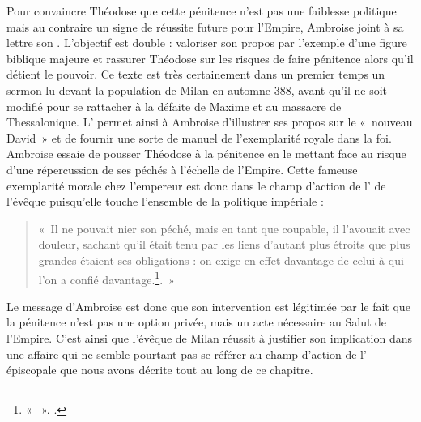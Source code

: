 \bigskip

Pour convaincre Théodose que cette pénitence n'est pas une faiblesse politique mais au contraire un signe de réussite future pour l'Empire, Ambroise joint à sa lettre son . L'objectif est double : valoriser son propos par l'exemple d'une figure biblique majeure et rassurer Théodose sur les risques de faire pénitence alors qu'il détient le pouvoir. Ce texte est très certainement dans un premier temps un sermon lu devant la population de Milan en automne 388, avant qu'il ne soit modifié pour se rattacher à la défaite de Maxime et au massacre de Thessalonique. L' permet ainsi à Ambroise d'illustrer ses propos sur le «~nouveau David~» et de fournir une sorte de manuel de l'exemplarité royale dans la foi. Ambroise essaie de pousser Théodose à la pénitence en le mettant face au risque d'une répercussion de ses péchés à l'échelle de l'Empire. Cette fameuse exemplarité morale chez l'empereur est donc dans le champ d'action de l' de l'évêque puisqu'elle touche l'ensemble de la politique impériale :

\bigskip

\begin{quote}
    «~Il ne pouvait nier son péché, mais en tant que coupable, il l’avouait avec douleur, sachant qu’il était tenu par les liens d'autant plus étroits que plus grandes étaient ses obligations : on exige en effet davantage de celui à qui l’on a confié davantage.\footnote{« ~». \cite[\nopp X, 51]{ambroise_apologie_david}.}.~»
\end{quote}

\bigskip

Le message d'Ambroise est donc que son intervention est légitimée par le fait que la pénitence n'est pas une option privée, mais un acte nécessaire au Salut de l'Empire. C'est ainsi que l'évêque de Milan réussit à justifier son implication dans une affaire qui ne semble pourtant pas se référer au champ d'action de l' épiscopale que nous avons décrite tout au long de ce chapitre.

\bigskip

